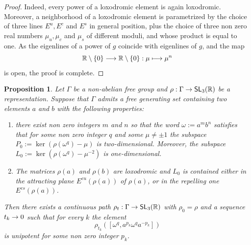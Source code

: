 \documentclass[10pt,a4paper]{amsart}
\DeclareMathOperator{\SL}{\mathsf{SL}}
\newcommand{\R}{\mathbb{R}}
\newcommand{\Es}{E^s}
\newcommand{\Ec}{E^c}
\newcommand{\Eu}{E^u}
\newcommand{\Ecs}{E^{cs}}
\newcommand{\Ecu}{E^{cu}}
\renewcommand*{\to}{\mathchoice{\longrightarrow}{\rightarrow}{\rightarrow}{\rightarrow}}
\let\oldmapsto\mapsto
\renewcommand*{\mapsto}{\mathchoice{\longmapsto}{\oldmapsto}{\oldmapsto}{\oldmapsto}}
\numberwithin{equation}{section}
\newtheorem{prop}[theo]{Proposition}
\theoremstyle{definition}\newtheorem{defi}[theo]{Definition}
\begin{document}
\begin{proof}
Indeed, every power of a loxodromic element is again loxodromic. Moreover, a neighborhood of a loxodromic element is parametrized by the choice of three lines $\Eu,\Ec$ and $\Es$ in general position, plus the choice of three non zero real numbers $\mu_u,\mu_c$ and $\mu_s$ of different moduli, and whose product is equal to one. As the eigenlines of a power of $g$ coincide with
eigenlines of $g$, and the map
\[
\R\setminus\{0\}\to \R\setminus\{0\}:
\mu\mapsto \mu^n
\]
is open, the proof is complete.
\end{proof}

\begin{prop}\label{prop: criterion for non robust qi}
Let $\Gamma$ be a non-abelian free group and $\rho:\Gamma\to \SL_3(\R)$ be a representation. Suppose that $\Gamma$ admits a free generating set containing two elements $a$ and $b$ with the following properties:
\begin{enumerate}
\item there exist non zero integers $m$ and $n$ so that the word $\omega:=a^mb^n$ satisfies that for some non zero integer $q$ and some $\mu\neq \pm 1$ the subspace $P_0:=\ker(\rho(\omega^q)-\mu)$ is two-dimensional. Moreover, the subspace $L_0:=\ker(\rho(\omega^q)-\mu^{-2})$ is one-dimensional.
\item The matrices $\rho(a)$ and $\rho(b)$ are loxodromic and $L_0$ is contained either in the attracting plane $\Ecu(\rho(a))$ of $\rho(a)$, or in the repelling one $\Ecs(\rho(a))$.
\end{enumerate}
Then there exists a continuous path $\rho_t:\Gamma\to\SL_3(\R)$ with $\rho_0=\rho$ and a sequence $t_k\to 0$ such that for every $k$ the element
\[
\rho_{t_k}([\omega^q,a^{p_k}\omega^qa^{-p_k}])
\]
is unipotent for some non zero integer $p_k$.
\end{prop}
\end{document}
